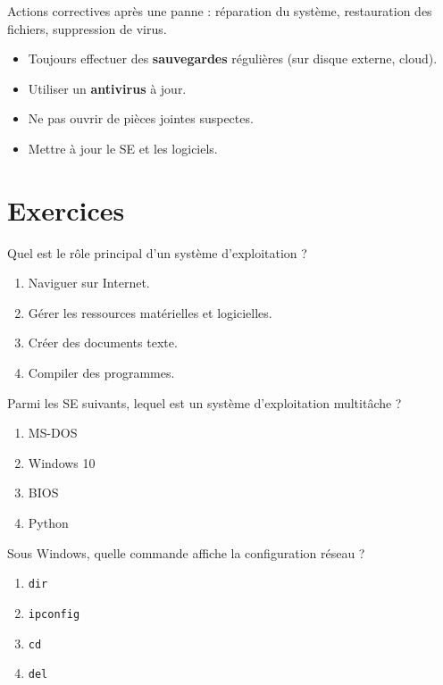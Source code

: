 \begin{definition}
Actions correctives après une panne : réparation du système, restauration des fichiers, suppression de virus.
\end{definition}

\begin{aretenir}
\begin{itemize}
    \item Toujours effectuer des \textbf{sauvegardes} régulières (sur disque externe, cloud).
    \item Utiliser un \textbf{antivirus} à jour.
    \item Ne pas ouvrir de pièces jointes suspectes.
    \item Mettre à jour le SE et les logiciels.
\end{itemize}
\end{aretenir}

\section{Exercices}


\exo{}
Quel est le rôle principal d'un système d'exploitation ?
\begin{enumerate}[label=\Alph*.]
    \item Naviguer sur Internet.
    \item Gérer les ressources matérielles et logicielles.
    \item Créer des documents texte.
    \item Compiler des programmes.
\end{enumerate}

\exo{}
Parmi les SE suivants, lequel est un système d'exploitation multitâche ?
\begin{enumerate}[label=\Alph*.]
    \item MS-DOS
    \item Windows 10
    \item BIOS
    \item Python
\end{enumerate}

\exo{}
Sous Windows, quelle commande affiche la configuration réseau ?
\begin{enumerate}[label=\Alph*.]
    \item \texttt{dir}
    \item \texttt{ipconfig}
    \item \texttt{cd}
    \item \texttt{del}
\end{enumerate}

